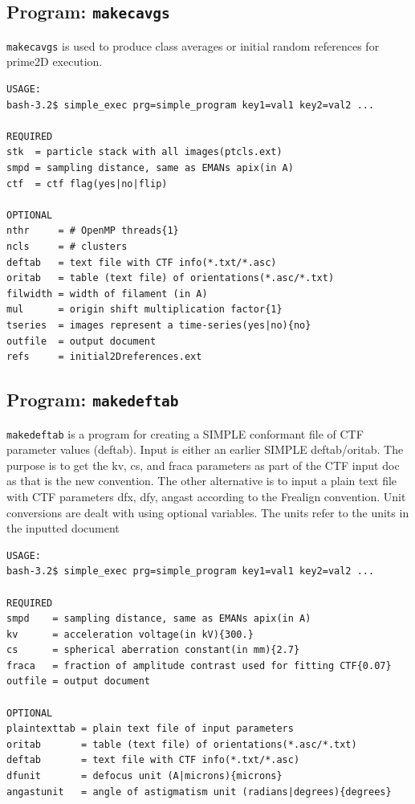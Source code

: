 \documentclass[a4paper,11pt]{article}
\newcommand{\prgname}[1]{\textcolor{NavyBlue}{\texttt{#1}}}
\begin{document}
\subsection{Program: \prgname{makecavgs}}
\label{makecavgs}
\prgname{makecavgs} is used  to produce class averages or initial random references for prime2D execution. 

\begin{verbatim}
USAGE:
bash-3.2$ simple_exec prg=simple_program key1=val1 key2=val2 ...

REQUIRED
stk  = particle stack with all images(ptcls.ext)
smpd = sampling distance, same as EMANs apix(in A)
ctf  = ctf flag(yes|no|flip)

OPTIONAL
nthr     = # OpenMP threads{1}
ncls     = # clusters
deftab   = text file with CTF info(*.txt/*.asc)
oritab   = table (text file) of orientations(*.asc/*.txt)
filwidth = width of filament (in A)
mul      = origin shift multiplication factor{1}
tseries  = images represent a time-series(yes|no){no}
outfile  = output document
refs     = initial2Dreferences.ext
\end{verbatim}

\subsection{Program: \prgname{makedeftab}}
\label{makedeftab}
\prgname{makedeftab} is a program for creating a SIMPLE conformant file of CTF parameter values (deftab). Input is either an earlier SIMPLE deftab/oritab. The purpose is to get the kv, cs, and fraca parameters as part of the CTF input doc as that is the new convention. The other alternative is to input a plain text file with CTF parameters dfx, dfy, angast according to the Frealign convention. Unit conversions are dealt with using optional variables. The units refer to the units in the inputted document

\begin{verbatim}
USAGE:
bash-3.2$ simple_exec prg=simple_program key1=val1 key2=val2 ...

REQUIRED
smpd    = sampling distance, same as EMANs apix(in A)
kv      = acceleration voltage(in kV){300.}
cs      = spherical aberration constant(in mm){2.7}
fraca   = fraction of amplitude contrast used for fitting CTF{0.07}
outfile = output document

OPTIONAL
plaintexttab = plain text file of input parameters
oritab       = table (text file) of orientations(*.asc/*.txt)
deftab       = text file with CTF info(*.txt/*.asc)
dfunit       = defocus unit (A|microns){microns}
angastunit   = angle of astigmatism unit (radians|degrees){degrees}
\end{verbatim}
\end{document}
